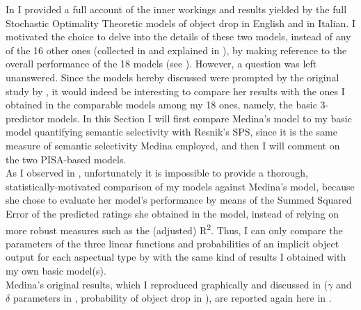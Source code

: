 In  I provided a full account of the inner workings and results yielded by the full Stochastic Optimality Theoretic models of object drop in English and in Italian. I motivated the choice to delve into the details of these two models, instead of any of the 16 other ones (collected in  and explained in ), by making reference to the overall performance of the 18 models (see ). However, a question was left unanswered. Since the models hereby discussed were prompted by the original study by \textcite{Medina2007}, it would indeed be interesting to compare her results with the ones I obtained in the comparable models among my 18 ones, namely, the basic 3-predictor models. In this Section I will first compare Medina's model to my basic model quantifying semantic selectivity with Resnik's SPS, since it is the same measure of semantic selectivity Medina employed, and then I will comment on the two PISA-based models.\\
As I observed in , unfortunately it is impossible to provide a thorough, statistically-motivated comparison of my models against Medina's model, because she chose to evaluate her model's performance by means of the Summed Squared Error of the predicted ratings she obtained in the model, instead of relying on more robust measures such as the (adjusted) R\textsuperscript{2}. Thus, I can only compare the parameters of the three linear functions and probabilities of an implicit object output for each aspectual type by \textcite[143-144]{Medina2007} with the same kind of results I obtained with my own basic model(s).\\
Medina's original results, which I reproduced graphically and discussed in  ($\gamma$ and $\delta$ parameters in , probability of object drop in ), are reported again here in  .



